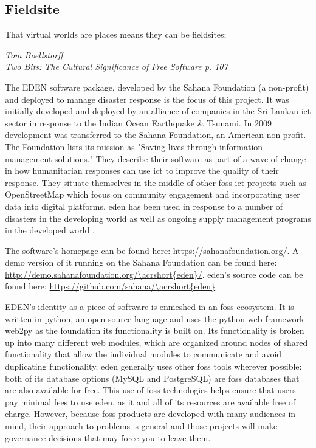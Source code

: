 \documentclass[a4paper,man,natbib]{apa6}
\begin{document}
   \subsection*{Fieldsite}
   \epigraph{That virtual worlds are places means they can be fieldsites;}{\textit{Tom Boellstorff \\ Two Bits: The Cultural Significance of Free Software p. 107}}

   The \acrfull{EDEN} software package, developed by the Sahana Foundation (a non-profit) and deployed to manage disaster response is the focus of this project. It was initially developed and deployed by an alliance of companies in the Sri Lankan \acrfull{ict} sector in response to the Indian Ocean Earthquake \& Tsunami. In 2009 development was transferred to the Sahana Foundation, an American non-profit. The Foundation lists its mission as "Saving lives through information management solutions." They describe their software as part of a wave of change in how humanitarian responses can use \acrshort{ict} to improve the quality of their response. They situate themselves in the middle of other \acrfull{foss} \acrshort{ict} projects such as \Gls{OpenStreetMap} which focus on community engagement and incorporating user data into digital platforms. \acrshort{eden} has been used in response to a number of disasters in the developing world as well as ongoing supply management programs in the developed world \citep{Sahana_Foundation_undated-hl}.

   The software's homepage can be found here: \url{https://sahanafoundation.org/}. \linebreak 
   A demo version of it running on the Sahana Foundation can be found here: \url{http://demo.sahanafoundation.org/\acrshort{eden}/}. \linebreak 
   \acrshort{eden}'s source code can be found here: \url{https://github.com/sahana/\acrshort{eden}} \linebreak 

   EDEN's identity as a piece of software is enmeshed in an \acrshort{foss} ecosystem. It is written in \Gls{python}, an open source language and uses the \Gls{python} \gls{web framework} web2py as the foundation its functionality is built on. Its functionality is broken up into many different web modules, which are organized around nodes of shared functionality that allow the individual modules to communicate and avoid duplicating functionality. \acrshort{eden} generally uses other \acrshort{foss} tools wherever possible: both of its database options (\Gls{MySQL} and \Gls{PostgreSQL}) are \acrshort{foss} databases that are also available for free. This use of \acrlong{foss} technologies helps ensure that users pay minimal fees to use \acrshort{eden}, as it and all of its resources are available free of charge. However, because \acrshort{foss} products are developed with many audiences in mind, their approach to problems is general and those projects will make governance decisions that may force you to leave them.
\end{document}
